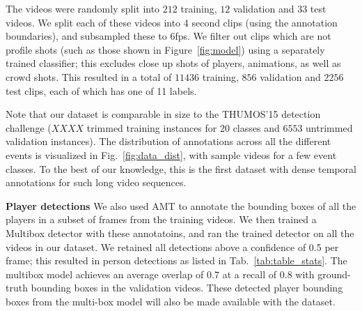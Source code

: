 The videos were randomly split into $212$ training, $12$ validation and $33$
test videos.  We split each of these videos into 4 second clips (using the
annotation boundaries), and subsampled these to 6fps.  We filter out clips
which are not profile shots (such as those shown in Figure~\ref{fig:model})
using a separately trained classifier; this excludes close up shots of players,
animations, as well as crowd shots.  This resulted in a total of $11436$
training, $856$ validation and $2256$ test clips, each of which has one of 11
labels.

Note that our dataset is comparable in size to the THUMOS'15 detection
challenge ($XXXX$ trimmed training instances for $20$ classes and $6553$
untrimmed validation instances). The distribution of annotations across all the
different events is visualized in Fig.~\ref{fig:data_dist}, with sample videos
for a few event classes. To the best of our
knowledge, this is the first dataset with dense temporal annotations for
such long video sequences.

\noindent \textbf{Player detections}
We also used AMT to annotate the bounding boxes of all the players in a
subset  of frames from the training videos.
We then trained a Multibox detector \cite{Szegedy_arxiv14}
with these annotatoins, and ran the trained detector on all the videos in our dataset.
We retained all detections above a confidence of 0.5 per frame;
this resulted in person detections as listed in Tab.~\ref{tab:table_stats}.
The multibox model achieves an average overlap of $0.7$ at a recall of $0.8$
with ground-truth bounding boxes in the validation videos.
These detected player bounding boxes from the
multi-box model will also be made available with the dataset.
